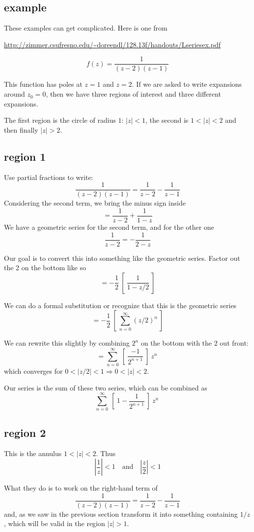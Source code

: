 \documentclass[11pt, oneside]{article}
\begin{document}
\subsection*{example}
These examples can get complicated.  Here is one from

\url{http://zimmer.csufresno.edu/~doreendl/128.13f/handouts/Lseriesex.pdf}

\[ f(z) = \frac{1}{(z-2)(z-1)} \]

This function has poles at $z = 1$ and $z = 2$.  If we are asked to write expansions around $z_0 = 0$, then we have three regions of interest and three different expansions.

The first region is the circle of radius $1$:  $|z| < 1$, the second is $1 < |z| < 2$ and then finally $|z| > 2$.

\subsection*{region 1}
Use partial fractions to write:
\[ \frac{1}{(z-2)(z-1)} = \frac{1}{z-2} - \frac{1}{z-1} \]
Considering the second term, we bring the minus sign inside
\[ = \frac{1}{z-2} + \frac{1}{1-z} \]
We have a geometric series for the second term, and for the other one
\[ \frac{1}{z - 2} = - \frac{1}{2 - z} \]

Our goal is to convert this into something like the geometric series.  Factor out the $2$ on the bottom like so
\[ = - \frac{1}{2} \ [ \  \frac{1}{1 - z/2} \ ]  \]

We can do a formal substitution or recognize that this is the geometric series 
\[ = - \frac{1}{2} \ [ \   \sum_{n=0}^{\infty} (z/2)^n \ ]  \]

We can rewrite this slightly by combining $2^n$ on the bottom with the $2$ out front:
\[ = \sum_{n=0}^{\infty} \ [ \ \frac{-1}{2^{n+1}} \ ] \  z^n \  \]
which converges for $0 < |z/2| < 1 \Rightarrow 0 < |z| < 2$.

Our series is the sum of these two series, which can be combined as
\[ \sum_{n=0}^{\infty} \ [ \ 1 - \frac{1}{2^{n+1}} \ ] \  z^n \  \]

\subsection*{region 2}
This is the annulus $1 < |z| < 2$.  Thus
\[ | \frac{1}{z} | < 1 \  \ \ \text{ and } \ \ \  |\frac{z}{2} | < 1 \]

What they do is to work on the right-hand term of
\[ \frac{1}{(z-2)(z-1)} = \frac{1}{z-2} - \frac{1}{z-1} \]
and, as we saw in the previous section transform it into something containing $1/z$, which will be valid in the region $|z| > 1$.
\end{document}
